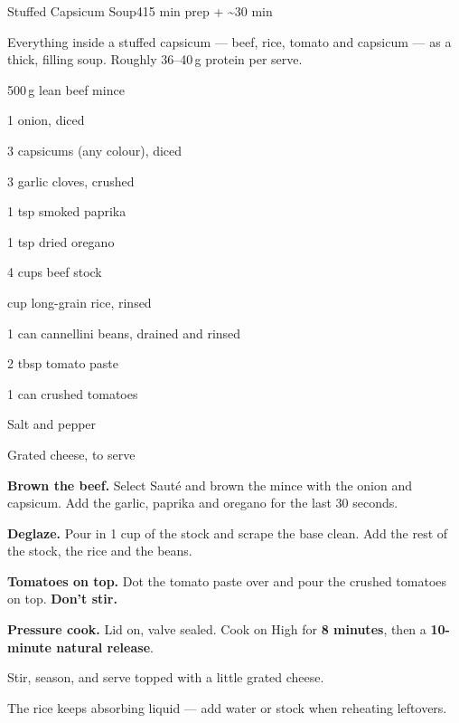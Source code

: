 \begin{recipebox}{Stuffed Capsicum Soup}{4}{15 min prep + \textasciitilde30 min}

Everything inside a stuffed capsicum --- beef, rice, tomato and capsicum --- as a
thick, filling soup. Roughly 36--40\,g protein per serve.

\begin{ingredients}
  \item 500\,g lean beef mince
  \item 1 onion, diced
  \item 3 capsicums (any colour), diced
  \item 3 garlic cloves, crushed
  \item 1 tsp smoked paprika
  \item 1 tsp dried oregano
  \item 4 cups beef stock
  \item {} cup long-grain rice, rinsed
  \item 1 can cannellini beans, drained and rinsed
  \item 2 tbsp tomato paste
  \item 1 can crushed tomatoes
  \item Salt and pepper
  \item Grated cheese, to serve
\end{ingredients}

\begin{method}
  \item \textbf{Brown the beef.} Select Saut\'e and brown the mince with the onion and capsicum. Add the garlic, paprika and oregano for the last 30 seconds.
  \item \textbf{Deglaze.} Pour in 1 cup of the stock and scrape the base clean. Add the rest of the stock, the rice and the beans.
  \item \textbf{Tomatoes on top.} Dot the tomato paste over and pour the crushed tomatoes on top. \textbf{Don't stir.}
  \item \textbf{Pressure cook.} Lid on, valve sealed. Cook on High for \textbf{8 minutes}, then a \textbf{10-minute natural release}.
  \item Stir, season, and serve topped with a little grated cheese.
\end{method}

\begin{notelist}
  \item The rice keeps absorbing liquid --- add water or stock when reheating leftovers.
\end{notelist}

\end{recipebox}
